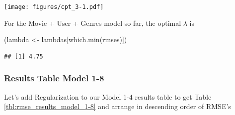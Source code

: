 \documentclass[
]{article}
\newenvironment{Shaded}{}{}
\newcommand{\AttributeTok}[1]{\textcolor[rgb]{0.49,0.56,0.16}{#1}}
\newcommand{\FunctionTok}[1]{\textcolor[rgb]{0.02,0.16,0.49}{#1}}
\newcommand{\NormalTok}[1]{#1}
\newcommand{\OtherTok}[1]{\textcolor[rgb]{0.00,0.44,0.13}{#1}}
\newcommand{\SpecialCharTok}[1]{\textcolor[rgb]{0.25,0.44,0.63}{#1}}
\newcommand{\StringTok}[1]{\textcolor[rgb]{0.25,0.44,0.63}{#1}}
\begin{document}
\begin{Shaded}
\end{Shaded}

\texttt{[image: figures/cpt\_3-1.pdf]}

For the Movie + User + Genres model so far, the optimal \(\lambda\) is

\begin{Shaded}
\begin{Highlighting}[]
\NormalTok{(lambda }\OtherTok{\textless{}{-}}\NormalTok{ lambdas[}\FunctionTok{which.min}\NormalTok{(rmses)])}
\end{Highlighting}
\end{Shaded}

\begin{verbatim}
## [1] 4.75
\end{verbatim}

\newpage

\hypertarget{results-table-model-1-8}{%
\subsubsection{Results Table Model 1-8}\label{results-table-model-1-8}}

Let's add Regularization to our Model 1-4 results table to get Table
\ref{tbl:rmse_results_model_1-8} and arrange in descending order of
RMSE's
\end{document}
